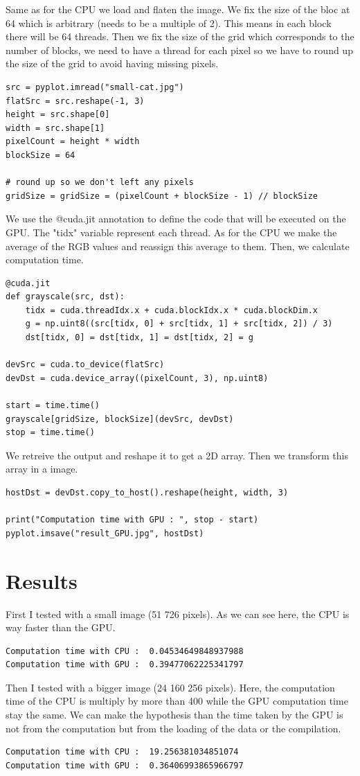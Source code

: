 \documentclass{report}
\begin{document}
Same as for the CPU we load and flaten the image. We fix the size of the bloc at 64 which is arbitrary (needs to be a multiple of 2). This means in each block there will be 64 threads. Then we fix the size of the grid which corresponds to the number of blocks, we need to have a thread for each pixel so we have to round up the size of the grid to avoid having missing pixels.
\begin{lstlisting}
src = pyplot.imread("small-cat.jpg")
flatSrc = src.reshape(-1, 3)
height = src.shape[0]
width = src.shape[1]
pixelCount = height * width
blockSize = 64

# round up so we don't left any pixels
gridSize = gridSize = (pixelCount + blockSize - 1) // blockSize
\end{lstlisting}
We use the @cuda.jit annotation to define the code that will be executed on the GPU. 
The "tidx" variable represent each thread. As for the CPU we make the average of the RGB values and reassign this average to them. 
Then, we calculate computation time.

\begin{lstlisting}
@cuda.jit
def grayscale(src, dst):
    tidx = cuda.threadIdx.x + cuda.blockIdx.x * cuda.blockDim.x
    g = np.uint8((src[tidx, 0] + src[tidx, 1] + src[tidx, 2]) / 3)
    dst[tidx, 0] = dst[tidx, 1] = dst[tidx, 2] = g

devSrc = cuda.to_device(flatSrc)
devDst = cuda.device_array((pixelCount, 3), np.uint8)

start = time.time()
grayscale[gridSize, blockSize](devSrc, devDst)
stop = time.time()
\end{lstlisting}
We retreive the output and reshape it to get a 2D array. Then we transform this array in a image.
\begin{lstlisting}
hostDst = devDst.copy_to_host().reshape(height, width, 3)

print("Computation time with GPU : ", stop - start)
pyplot.imsave("result_GPU.jpg", hostDst)
\end{lstlisting}
\newpage
\section{Results}
First I tested with a small image (51 726 pixels). As we can see here, the CPU is way faster than the GPU.
\begin{verbatim}
Computation time with CPU :  0.04534649848937988
Computation time with GPU :  0.39477062225341797
\end{verbatim}

Then I tested with a bigger image (24 160 256 pixels). Here, the computation time of the CPU is multiply by more than 400 while the GPU computation time stay the same. We can make the hypothesis than the time taken by the GPU is not from the computation but from the loading of the data or the compilation.
\begin{verbatim}
Computation time with CPU :  19.256381034851074
Computation time with GPU :  0.36406993865966797
\end{verbatim}
\end{document}
